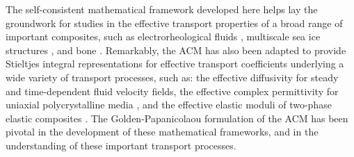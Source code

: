\documentclass{cmslatex}
\renewcommand{\theequation}{\arabic{section}.\arabic{equation}}
\begin{document}
The self-consistent mathematical framework developed here helps lay
the groundwork for studies in the effective transport properties of a
broad range of important composites, such as electrorheological fluids
\cite{Murphy:PHD_Thesis}, multiscale sea ice structures
\cite{Murphy_Multiscale_Sea_Ice}, and bone
\cite{Golden:JBM:337}. Remarkably, the ACM  has also been adapted to
provide Stieltjes integral representations for  effective transport
coefficients underlying a wide variety of transport processes, such
as: the effective diffusivity for steady
\cite{McLaughlin:SIAM_JAM:780,Avellaneda:CMP-339,Murphy_Advective_Diffusion}
and time-dependent
\cite{Avellaneda:PRE:3249,Murphy_Advective_Diffusion_Dynamic}
fluid velocity fields, the effective complex permittivity for uniaxial
polycrystalline media
\cite{Barabash:JPCM:10323,Gully_Golden_Polycrystalline,Murphy_Polycrystalline_Media_ACM},
and the effective elastic moduli of two-phase elastic composites
\cite{Ou:MMAS:655,Ou:2012:411}. The Golden-Papanicolaou formulation of
the ACM has been pivotal in the development of these mathematical
frameworks, and in the understanding of these important transport
processes.  

  \setcounter{equation}{1}  %
  \setcounter{section}{0}  %
  \renewcommand{\theequation}{A-\arabic{equation}} 
\renewcommand{\thesection}{A-\arabic{section}}
\end{document}
